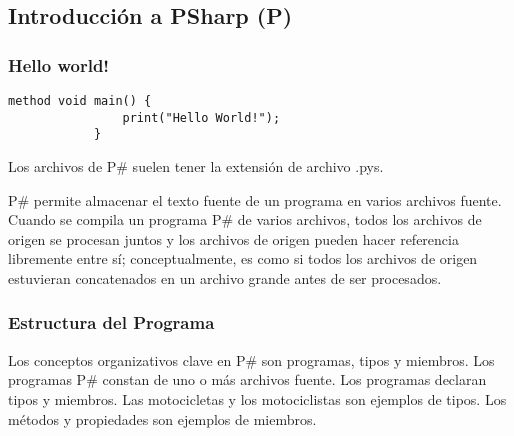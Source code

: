\subsection{Introducción a PSharp (P)}
	\subsubsection{Hello world!}
	
		\begin{lstlisting}[language={PSharp}]
			method void main() {
				print("Hello World!");
			}
		\end{lstlisting}	
		Los archivos de P\# suelen tener la extensión de archivo .pys.\par
		
		P\# permite almacenar el texto fuente de un programa en varios archivos fuente. Cuando se compila un programa P\# de varios archivos, todos los archivos de origen se procesan juntos y los archivos de origen pueden hacer referencia libremente entre sí; conceptualmente, es como si todos los archivos de origen estuvieran concatenados en un archivo grande antes de ser procesados.		
		
	\subsubsection{Estructura del Programa}
		Los conceptos organizativos clave en P\# son programas, tipos y miembros. Los programas P\# constan de uno o más archivos fuente. Los programas declaran tipos y miembros. Las motocicletas y los motociclistas son ejemplos de tipos. Los métodos y propiedades son ejemplos de miembros.
		
